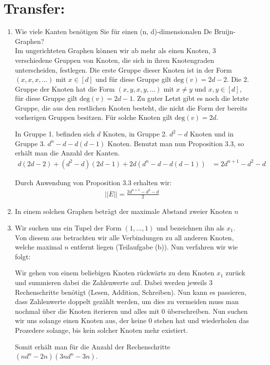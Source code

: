     \section*{Transfer:}
    \begin{enumerate}[label=(\alph*)]
    	\item Wie viele Kanten benötigen Sie für einen (n, d)-dimensionalen De Bruijn-Graphen?\\
        Im ungerichteten Graphen können wir ab mehr als einen Knoten, 3 verschiedene Gruppen von Knoten, die sich in ihren Knotengraden unterscheiden, festlegen. Die erste Gruppe dieser Knoten ist in der Form $(x,x,x,\ldots)$ mit $x \in [d]$ und für diese Gruppe gilt $\textrm{deg}(v) = 2d -2$. Die 2. Gruppe der Knoten hat die Form $(x,y,x,y,\ldots)$ mit $x \not = y$ und $x,y \in [d]$, für diese Gruppe gilt $\textrm{deg}(v) = 2d -1$. Zu guter Letzt gibt es noch die letzte Gruppe, die aus den restlichen Knoten besteht, die nicht die Form der bereits vorherigen Gruppen besitzen. Für solche Knoten gilt $\textrm{deg}(v) = 2d$.\par
        In Gruppe 1. befinden sich $d$ Knoten, in Gruppe 2. $d^2-d$ Knoten und in Gruppe 3. $d^n - d - d(d-1)$ Knoten. Benutzt man nun Proposition 3.3, so erhält man die Anzahl der Kanten. 
        \begin{align*}
        d(2d-2) + (d^2-d)(2d-1) + 2d(d^n-d-d(d-1)) &= 2d^{n+1}-d^2-d
        \end{align*}
        
        Durch Anwendung von Proposition 3.3 erhalten wir:
        \begin{align*}
        ||E|| = \frac{2d^{n+1}-d^2-d}{2}
        \end{align*}
        
        \item In einem solchen Graphen beträgt der maximale Abstand zweier Knoten $n$
        
        \item Wir suchen uns ein Tupel der Form $(1,\ldots,1)$ und bezeichnen ihn als $x_1$. Von diesem aus betrachten wir alle Verbindungen zu all anderen Knoten, welche maximal $n$ entfernt liegen (Teilaufgabe (b)). Nun verfahren wir wie folgt: \par
        Wir gehen von einem beliebigen Knoten rückwärts zu dem Knoten $x_1$ zurück  und summieren dabei die Zahlenwerte auf. Dabei werden jeweils 3 Rechenschritte benötigt (Lesen, Addition, Schreiben). Nun kann es passieren, dass Zahlenwerte doppelt gezählt werden, um dies zu vermeiden muss man nochmal über die Knoten iterieren und alles mit 0 überschreiben. Nun suchen wir uns solange einen Knoten aus, der keine 0 stehen hat und wiederholen das Prozedere solange, bis kein solcher Knoten mehr existiert. \par
        Somit erhält man für die Anzahl der Rechenschritte $(nd^n-2n)(3nd^n-3n)$.
        
    \end{enumerate}

